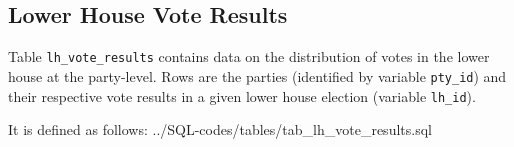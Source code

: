 \subsection{Lower House Vote Results}\label{subsec_tab_lh_vote_results}
Table \texttt{lh\_vote\_results} contains data on the distribution of votes in the lower house at the party-level. 
Rows are the parties (identified by variable \texttt{pty\_id}) and their respective vote results in a given lower house election (variable \texttt{lh\_id}).


It is defined as follows: 
%
{../SQL-codes/tables/tab_lh_vote_results.sql}

